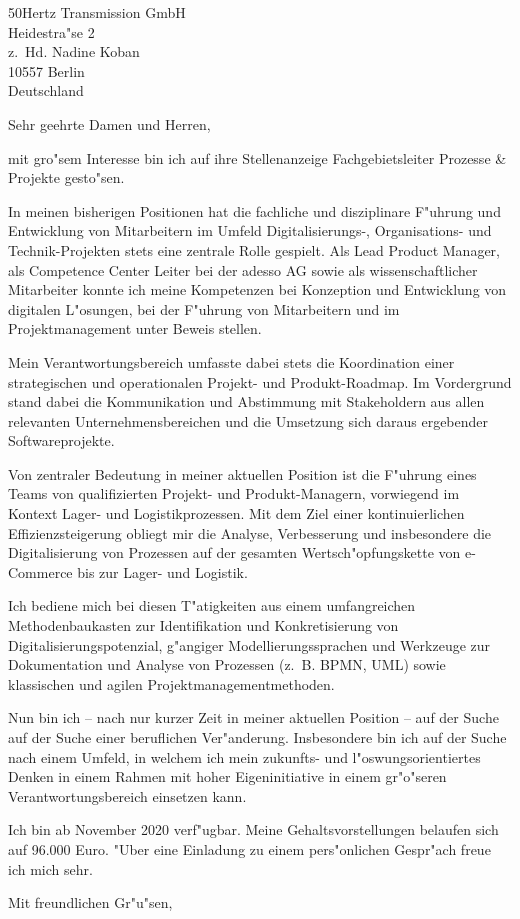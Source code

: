 \documentclass[10pt,a4paper]{dinbrief}
\date{\today}
\begin{document}
 
\begin{letter}  
{%
	50Hertz Transmission GmbH\\
	Heidestra"se 2\\
	z.~Hd. Nadine Koban \\
	10557 Berlin\\
	Deutschland
}
\subject{\bf Bewerbung Fachgebietsleiter Prozesse \& Projekte (Stellen ID 1570)}
\opening{Sehr geehrte Damen und Herren,}
mit gro"sem Interesse bin ich auf ihre Stellenanzeige Fachgebietsleiter Prozesse \& Projekte gesto"sen.

In meinen bisherigen Positionen hat die fachliche und disziplinare F"uhrung und Entwicklung von Mitarbeitern im Umfeld Digitalisierungs-, Organisations- und Technik-Projekten stets eine zentrale Rolle gespielt. Als Lead Product Manager, als Competence Center Leiter bei der adesso AG sowie als wissenschaftlicher Mitarbeiter konnte ich meine Kompetenzen bei Konzeption und Entwicklung von digitalen L"osungen, bei der F"uhrung von Mitarbeitern und im Projektmanagement unter Beweis stellen.

Mein Verantwortungsbereich umfasste dabei stets die Koordination einer strategischen und operationalen Projekt- und Produkt-Roadmap. Im Vordergrund stand dabei die Kommunikation und Abstimmung mit Stakeholdern aus allen relevanten Unternehmensbereichen und die Umsetzung sich daraus ergebender  Softwareprojekte. 

Von zentraler Bedeutung in meiner aktuellen Position ist die F"uhrung eines Teams von qualifizierten Projekt- und Produkt-Managern, vorwiegend im Kontext Lager- und Logistikprozessen. Mit dem Ziel einer kontinuierlichen Effizienzsteigerung obliegt mir die Analyse, Verbesserung und insbesondere die Digitalisierung von Prozessen auf der gesamten Wertsch"opfungskette von e-Commerce bis zur Lager- und Logistik. 

Ich bediene mich bei diesen T"atigkeiten aus einem umfangreichen Methodenbaukasten zur Identifikation und Konkretisierung von Digitalisierungspotenzial,  g"angiger Modellierungssprachen und Werkzeuge zur Dokumentation und Analyse von Prozessen (z.~B. BPMN, UML) sowie klassischen und agilen Projektmanagementmethoden.\clearpage

Nun bin ich -- nach nur kurzer Zeit in meiner aktuellen Position -- auf der Suche auf der Suche einer beruflichen Ver"anderung. Insbesondere bin ich auf der Suche nach einem Umfeld, in welchem ich mein zukunfts- und l"oswungsorientiertes Denken in einem Rahmen mit hoher Eigeninitiative in einem gr"o"seren Verantwortungsbereich einsetzen kann.

Ich bin ab November 2020 verf"ugbar. Meine Gehaltsvorstellungen belaufen sich auf 96.000 Euro. "Uber eine Einladung zu einem pers"onlichen Gespr"ach freue ich mich sehr.

\closing{Mit freundlichen Gr"u"sen,}
\end{letter}
\end{document}
